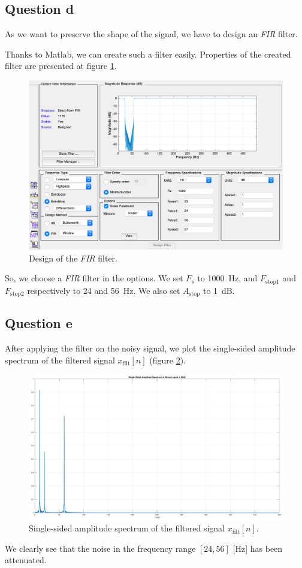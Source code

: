 \documentclass[a4paper, 12pt]{article}
\begin{document}
	\subsection*{Question d}
	As we want to preserve the shape of the signal, we have to design an \emph{FIR} filter.\par
	Thanks to Matlab, we can create such a filter easily. Properties of the created filter are presented at figure \ref{fig:question_d}.
	\begin{figure}[H]
	    \centering
	    \includegraphics[width=\textwidth]{resources/pdf/question_d.pdf}
	    \caption{Design of the \emph{FIR} filter.}
	    \label{fig:question_d}
	\end{figure}
	So, we choose a \emph{FIR} filter in the options. We set $F_s$ to \SI{1000}{\hertz}, and $F_\text{stop1}$ and $F_\text{stop2}$ respectively to \num{24} and \SI{56}{\hertz}. We also set $A_\text{stop}$ to \SI{1}{\deci\bel}.
	\subsection*{Question e}
	After applying the filter on the noisy signal, we plot the single-sided amplitude spectrum of the filtered signal $x_\text{filt}[n]$ (figure \ref{fig:question_e}).
	\begin{figure}[H]
	    \centering
	    \includegraphics[width=\textwidth]{resources/pdf/question_e.pdf}
	    \caption{Single-sided amplitude spectrum of the filtered signal $x_\text{filt}[n]$.}
	    \label{fig:question_e}
	\end{figure}
	We clearly see that the noise in the frequency range $[24, 56]$ [Hz] has been attenuated.
\end{document}
